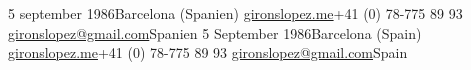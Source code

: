\ifswedish
    {5 september 1986}{Barcelona (Spanien)}
    {\href{http://gironslopez.me}{gironslopez.me}}{+41 (0) 78-775 89 93}
    {\href{mailto:gironslopez@gmail.com}{gironslopez@gmail.com}}{Spanien}
\else
    {5 September 1986}{Barcelona (Spain)}
    {\href{http://gironslopez.me}{gironslopez.me}}{+41 (0) 78-775 89 93}
    {\href{mailto:gironslopez@gmail.com}{gironslopez@gmail.com}}{Spain}
\fi
